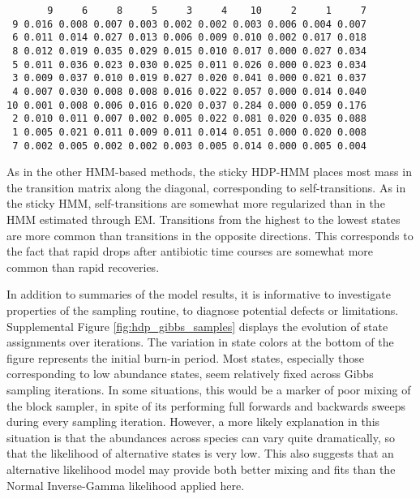 \documentclass[14pt]{extarticle}
\begin{document}
\begin{verbatim}
       9     6     8     5     3     4    10     2     1     7
 9 0.016 0.008 0.007 0.003 0.002 0.002 0.003 0.006 0.004 0.007
 6 0.011 0.014 0.027 0.013 0.006 0.009 0.010 0.002 0.017 0.018
 8 0.012 0.019 0.035 0.029 0.015 0.010 0.017 0.000 0.027 0.034
 5 0.011 0.036 0.023 0.030 0.025 0.011 0.026 0.000 0.023 0.034
 3 0.009 0.037 0.010 0.019 0.027 0.020 0.041 0.000 0.021 0.037
 4 0.007 0.030 0.008 0.008 0.016 0.022 0.057 0.000 0.014 0.040
10 0.001 0.008 0.006 0.016 0.020 0.037 0.284 0.000 0.059 0.176
 2 0.010 0.011 0.007 0.002 0.005 0.022 0.081 0.020 0.035 0.088
 1 0.005 0.021 0.011 0.009 0.011 0.014 0.051 0.000 0.020 0.008
 7 0.002 0.005 0.002 0.002 0.003 0.005 0.014 0.000 0.005 0.004
\end{verbatim}

As in the other HMM-based methods, the sticky HDP-HMM places most mass in the
transition matrix along the diagonal, corresponding to self-transitions. As in
the sticky HMM, self-transitions are somewhat more regularized than in the HMM
estimated through EM. Transitions from the highest to the lowest states are more
common than transitions in the opposite directions. This corresponds to the fact
that rapid drops after antibiotic time courses are somewhat more common than
rapid recoveries.

In addition to summaries of the model results, it is informative to investigate
properties of the sampling routine, to diagnose potential defects or
limitations. Supplemental Figure \ref{fig:hdp_gibbs_samples} displays the
evolution of state assignments over iterations. The variation in state colors at
the bottom of the figure represents the initial burn-in period. Most states,
especially those corresponding to low abundance states, seem relatively fixed
across Gibbs sampling iterations. In some situations, this would be a marker of
poor mixing of the block sampler, in spite of its performing full forwards and
backwards sweeps during every sampling iteration. However, a more likely
explanation in this situation is that the abundances across species can vary
quite dramatically, so that the likelihood of alternative states is very low.
This also suggests that an alternative likelihood model may provide both better
mixing and fits than the Normal Inverse-Gamma likelihood applied here.

\end{document}
